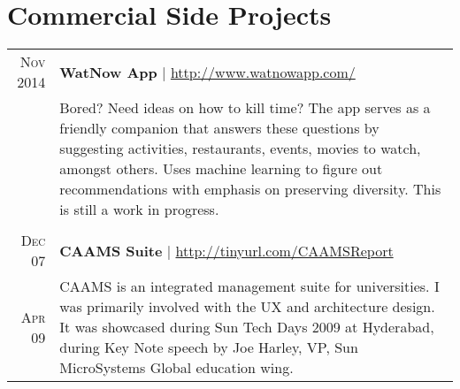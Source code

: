 \documentclass[a4paper,11pt]{article}
\begin{document}
\section{Commercial Side Projects}
\begin{longtable}{r|p{12.5cm}}
\textsc{Nov 2014} & \textbf{WatNow App} | \href{http://www.watnowapp.com/}{http://www.watnowapp.com/} \\
 & \footnotesize{ \begin{minipage}[t]{12.5cm} Bored? Need ideas on how to kill time? The app serves as a friendly companion that answers these questions by suggesting activities, restaurants, events, movies to watch, amongst others. Uses machine learning to figure out recommendations with emphasis on preserving diversity. This is still a work in progress. 
 \end{minipage}}
 \\
 \multicolumn{2}{c}{}
 \\
  \textsc{Dec 07} & \textbf{CAAMS Suite} | \href{http://tinyurl.com/CAAMSReport}{http://tinyurl.com/CAAMSReport}\\
 \textsc{Apr 09} & \footnotesize{ \begin{minipage}[t]{12.5cm}
 CAAMS is an integrated management suite for universities. I was primarily involved with the UX and architecture design. It was showcased during Sun Tech Days 2009 at Hyderabad, during Key Note speech by Joe Harley, VP, Sun MicroSystems Global education wing. 
 \end{minipage}}\\
\end{longtable}
\end{document}
